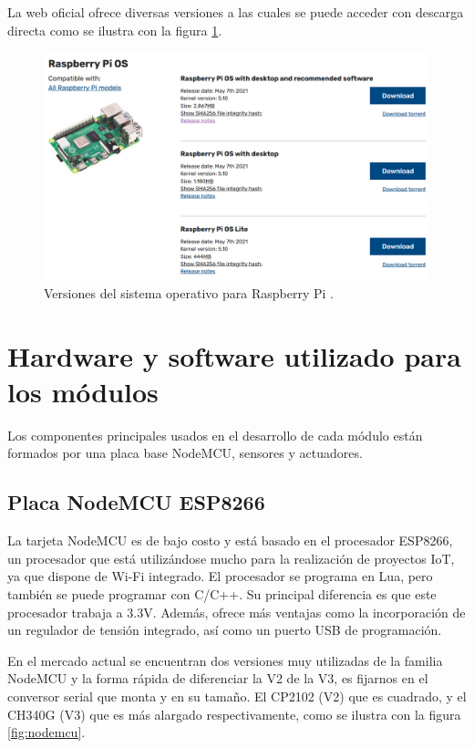 La web oficial ofrece diversas versiones a las cuales se puede acceder con descarga directa como se ilustra con la figura \ref{fig:so}.

\begin{figure}[htbp]
	\centering
	\includegraphics[width=.95\textwidth]{./Figures/so.png}
	\caption{Versiones del sistema operativo para Raspberry Pi \protect\footnotemark.}
	\label{fig:so}
\end{figure}


\section{Hardware y software utilizado para los módulos}

Los componentes principales usados en el desarrollo de cada módulo están formados por una placa base NodeMCU, sensores y actuadores.

\subsection{Placa NodeMCU ESP8266}

La tarjeta NodeMCU es de bajo costo y está basado en el procesador ESP8266, un procesador que está utilizándose mucho para la realización de proyectos IoT, ya que dispone de Wi-Fi integrado. El procesador se programa en Lua, pero también se puede programar con C/C++. Su principal diferencia es que este procesador trabaja a 3.3V.  Además, ofrece más ventajas como la incorporación de un regulador de tensión integrado, así como un puerto USB de programación. 

En el mercado actual se encuentran dos versiones muy utilizadas de la familia NodeMCU y la forma rápida de diferenciar la V2 de la V3, es fijarnos en el conversor serial que monta y en su tamaño. El CP2102 (V2) que es cuadrado, y el CH340G (V3) que es más alargado respectivamente, como se ilustra con la figura \ref{fig:nodemcu}.
 

